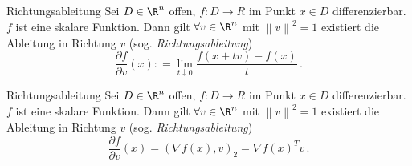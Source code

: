 \begin{definition}{Richtungsableitung}
    Sei $D \in \R^n$ offen, $f : D \to R$ im Punkt $x \in D$ differenzierbar. $f$ ist eine skalare Funktion.
    Dann gilt $\forall v \in \R^n$ mit $\left\|v\right\|^2 = 1$ existiert die Ableitung in Richtung $v$ (sog. \emph{Richtungsableitung})
    $$
        \frac{\partial f}{\partial v}(x) : = \lim_{t \downarrow 0} \frac{f(x + t v) - f(x)}{t} \, .
    $$
\end{definition}

\begin{lemma}{Richtungsableitung}
    Sei $D \in \R^n$ offen, $f : D \to R$ im Punkt $x \in D$ differenzierbar. $f$ ist eine skalare Funktion.
    Dann gilt $\forall v \in \R^n$ mit $\left\|v\right\|^2 = 1$ existiert die Ableitung in Richtung $v$ (sog. \emph{Richtungsableitung})
    $$
        \frac{\partial f}{\partial v}(x) = (\nabla f(x), v)_2 = \nabla f(x)^T v \, .
    $$
\end{lemma}